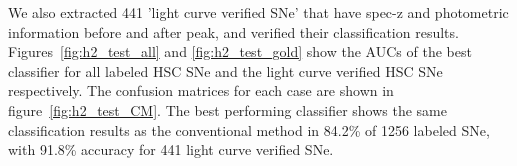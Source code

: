 \documentclass[useamsfonts]{pasj01}
\begin{document}
We also extracted 441 'light curve verified SNe' that have spec-z and photometric information before and after peak, and verified their classification results.
Figures\ \ref{fig:h2_test_all} and \ref{fig:h2_test_gold} show the AUCs of the best classifier for all labeled HSC SNe and the light curve verified HSC SNe respectively.
The confusion matrices for each case are shown in figure\ \ref{fig:h2_test_CM}.
The best performing classifier shows the same classification results as the conventional method in 84.2\% of 1256 labeled SNe, with 91.8\% accuracy for 441 light curve verified SNe.
%
%
%
%
\end{document}
